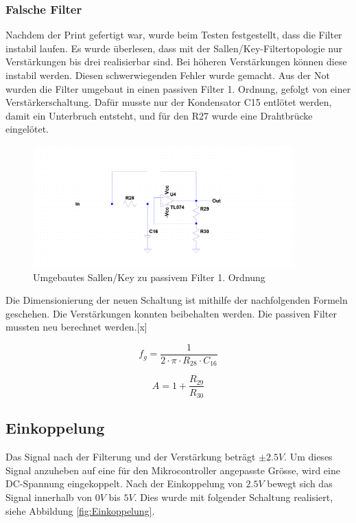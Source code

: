 \subsubsection*{Falsche Filter}
Nachdem der Print gefertigt war, wurde beim Testen festgestellt, dass die Filter instabil laufen. Es wurde überlesen, dass mit der Sallen/Key-Filtertopologie nur Verstärkungen bis drei realisierbar sind. Bei höheren Verstärkungen können diese instabil werden. Diesen schwerwiegenden Fehler wurde gemacht. Aus der Not wurden die Filter umgebaut in einen passiven Filter 1. Ordnung, gefolgt von einer Verstärkerschaltung. Dafür musste nur der Kondensator C15 entlötet werden, damit ein Unterbruch entsteht, und für den R27 wurde eine Drahtbrücke eingelötet.

\begin{figure}[H]
\begin{center}
\includegraphics[width=0.9\textwidth]{images/Analoge_Schaltung_Sallentopassive.png}
\caption{Umgebautes Sallen/Key zu passivem Filter 1. Ordnung}
\end{center}
\end{figure}

Die Dimensionierung der neuen Schaltung ist mithilfe der nachfolgenden Formeln geschehen. Die Verstärkungen konnten beibehalten werden. Die passiven Filter mussten neu berechnet werden.[x]

\begin{equation}
f_g=\frac{1}{2 \cdot \pi \cdot R_{28} \cdot C_{16}}
\label{eq:Grenzfrequenz}
\end{equation}

\begin{equation}
A=1+\frac{R_{29}}{R_{30}}
\label{eq:Verstärkung}
\end{equation}

\subsection{Einkoppelung}
Das Signal nach der Filterung und der Verstärkung beträgt $\pm 2.5V$. Um dieses Signal anzuheben auf eine für den Mikrocontroller angepasste Grösse, wird eine DC-Spannung eingekoppelt. Nach der Einkoppelung von $2.5V$ bewegt sich das Signal innerhalb von $0V$ bis $5V$. Dies wurde mit folgender Schaltung realisiert, siehe Abbildung \ref{fig:Einkoppelung}.


